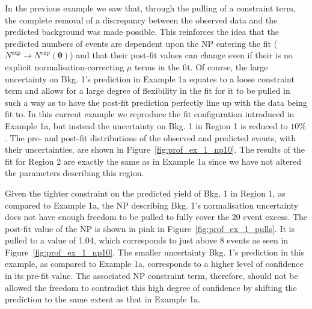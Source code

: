 In the previous example we saw that, through the pulling of a constraint term,
the complete removal of a discrepancy between the observed data and the
predicted background was made possible.
This reinforces the idea that the predicted numbers of events are dependent
upon the NP entering the fit ($N^{\text{exp}} \rightarrow N^{\text{exp}}(\bm{\theta})$)
and that their post-fit values can change even if their is no explicit normalisation-correcting $\mu$ terms in the fit.
Of course, the large uncertainty on Bkg. 1's prediction in Example 1a equates to a loose constraint term and allows for a large degree of
flexibility in the fit for it to be pulled in such a way as to have the post-fit prediction perfectly line up with
the data being fit to.
In this current example we reproduce the fit configuration introduced in Example 1a, but instead the
uncertainty on Bkg. 1 in Region 1 is reduced to $10\%$.
The pre- and post-fit distributions of the observed and predicted events, with their uncertainties,
are shown in Figure~\ref{fig:prof_ex_1_np10}.
The results of the fit for Region 2 are exactly the same as in Example 1a since we have not altered
the parameters describing this region.

Given the tighter constraint on the predicted yield of Bkg. 1 in Region 1, as compared to Example 1a,
the NP describing Bkg. 1's normalisation uncertainty does not have enough freedom to be pulled to fully
cover the 20 event excess.
The post-fit value of the NP is shown in pink in Figure~\ref{fig:prof_ex_1_pulls}.
It is pulled to a value of 1.04, which corresponds to just above 8 events as seen in Figure~\ref{fig:prof_ex_1_np10}.
The smaller uncertainty Bkg. 1's prediction in this example, as compared to Example 1a, corresponds
to a higher level of confidence in its pre-fit value.
The associated NP constraint term, therefore, should not be allowed the freedom to contradict this
high degree of confidence by shifting the prediction to the same extent as that in Example 1a.

